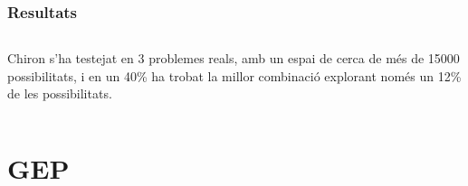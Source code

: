 \documentclass{beamer}
\begin{document}
\begin{frame}
	\frametitle{Resultats}
	\begin{columns}[c]
		Chiron s'ha testejat en 3 problemes reals, amb un espai de cerca de més de 15000
		possibilitats, i en un 40\% ha trobat la millor combinació explorant només un
		12\% de les possibilitats.
	\end{columns}
\end{frame}

\section{GEP} %
\label{sec:GEP}

\end{document}
